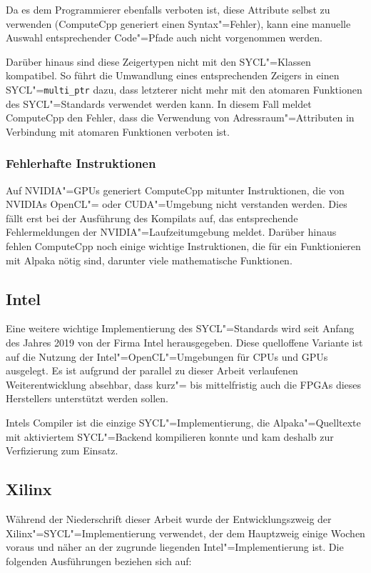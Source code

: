 Da es dem Programmierer ebenfalls verboten ist, diese Attribute selbst zu
verwenden (ComputeCpp generiert einen Syntax"=Fehler), kann eine manuelle
Auswahl entsprechender Code"=Pfade auch nicht vorgenommen werden.

Darüber hinaus sind diese Zeigertypen nicht mit den SYCL"=Klassen kompatibel.
So führt die Umwandlung eines entsprechenden Zeigers in einen
SYCL"=\texttt{multi\_ptr} dazu, dass letzterer nicht mehr mit den atomaren
Funktionen des SYCL"=Standards verwendet werden kann. In diesem Fall meldet
ComputeCpp den Fehler, dass die Verwendung von Adressraum"=Attributen in
Verbindung mit atomaren Funktionen verboten ist.

\subsubsection{Fehlerhafte Instruktionen}

Auf NVIDIA"=GPUs generiert ComputeCpp mitunter Instruktionen, die von NVIDIAs
OpenCL"= oder CUDA"=Umgebung nicht verstanden werden. Dies fällt erst bei der
Ausführung des Kompilats auf, das entsprechende Fehlermeldungen der
NVIDIA"=Laufzeitumgebung meldet. Darüber hinaus fehlen ComputeCpp noch einige
wichtige Instruktionen, die für ein Funktionieren mit Alpaka nötig sind,
darunter viele mathematische Funktionen.

\subsection{Intel}

Eine weitere wichtige Implementierung des SYCL"=Standards wird seit Anfang des
Jahres 2019 von der Firma Intel herausgegeben. Diese quelloffene Variante ist
auf die Nutzung der Intel"=OpenCL"=Umgebungen für CPUs und GPUs ausgelegt. Es
ist aufgrund der parallel zu dieser Arbeit verlaufenen Weiterentwicklung
absehbar, dass kurz"= bis mittelfristig auch die FPGAs dieses Herstellers
unterstützt werden sollen.

Intels Compiler ist die einzige SYCL"=Implementierung, die Alpaka"=Quelltexte
mit aktiviertem SYCL"=Backend kompilieren konnte und kam deshalb zur
Verfizierung zum Einsatz.

\subsection{Xilinx}
\label{ergebnisse:nutzbarkeit:xilinx}

Während der Niederschrift dieser Arbeit wurde der Entwicklungszweig der
Xilinx"=SYCL"=Implementierung verwendet, der dem Hauptzweig einige Wochen voraus
und näher an der zugrunde liegenden Intel"=Implementierung ist. Die folgenden
Ausführungen beziehen sich auf:

